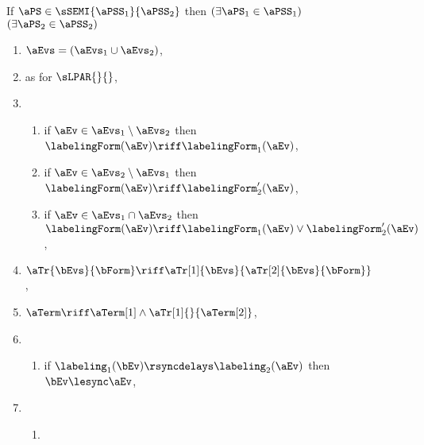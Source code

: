\begin{figure}
  \noindent
  If $\aPS \in \sSEMI{\aPSS_1}{\aPSS_2}$ then
  $(\exists\aPS_1\in\aPSS_1)$ $(\exists\aPS_2\in\aPSS_2)$
  \begin{multicols}{2}
    \begin{enumerate}[topsep=0pt,label=(\textsc{s}\arabic*),ref=\textsc{s}\arabic*]
    \item \label{seq-E}
      $\aEvs = (\aEvs_1\cup\aEvs_2)$,
    \item \label{seq-lambda}
       as for $\sLPAR{}{}$,
    \item[] \setcounter{enumi}{\value{kappa}} 
      \begin{enumerate}[leftmargin=0pt]
      \item \label{seq-kappa1}
        if $\aEv\in\aEvs_1\setminus\aEvs_2$ then $\labelingForm(\aEv) \riff \labelingForm_1(\aEv)$,
      \item \label{seq-kappa2}
        if $\aEv\in\aEvs_2\setminus\aEvs_1$ then $\labelingForm(\aEv) \riff \labelingForm'_2(\aEv)$,%
      \item \label{seq-kappa12}
        if $\aEv\in\aEvs_1\cap\aEvs_2$ then $\labelingForm(\aEv) \riff \labelingForm_1(\aEv)\lor\labelingForm'_2(\aEv)$,%
      \end{enumerate}
    \item \label{seq-tau}
      $\aTr{\bEvs}{\bForm} \riff \aTr[1]{\bEvs}{\aTr[2]{\bEvs}{\bForm}}$,
    \item \label{seq-term}
      $\aTerm \riff \aTerm[1]\land\aTr[1]{}{\aTerm[2]}$,
    \item[] \setcounter{enumi}{\value{lesync}}
      \begin{enumerate}[leftmargin=0pt]
      \item \label{seq-delay-sync}
        if $\labeling_1(\bEv)\rsyncdelays\labeling_2(\aEv)$
        then $\bEv\lesync\aEv$,
      \end{enumerate}
    \item[] \setcounter{enumi}{\value{leloc}}
      \begin{enumerate}[leftmargin=0pt]
      \item \label{seq-delay-co}

\end{enumerate}
\end{enumerate}
\end{multicols}
\end{figure}
